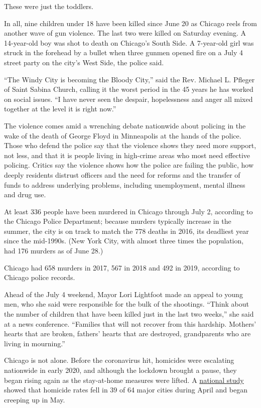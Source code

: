 These were just the toddlers.

In all, nine children under 18 have been killed since June 20 as Chicago
reels from another wave of gun violence. The last two were killed on
Saturday evening. A 14-year-old boy was shot to death on Chicago's South
Side. A 7-year-old girl was struck in the forehead by a bullet when
three gunmen opened fire on a July 4 street party on the city's West
Side, the police said.

``The Windy City is becoming the Bloody City,'' said the Rev. Michael L.
Pfleger of Saint Sabina Church, calling it the worst period in the 45
years he has worked on social issues. ``I have never seen the despair,
hopelessness and anger all mixed together at the level it is right
now.''

The violence comes amid a wrenching debate nationwide about policing in
the wake of the death of George Floyd in Minneapolis at the hands of the
police. Those who defend the police say that the violence shows they
need more support, not less, and that it is people living in high-crime
areas who most need effective policing. Critics say the violence shows
how the police are failing the public, how deeply residents distrust
officers and the need for reforms and the transfer of funds to address
underlying problems, including unemployment, mental illness and drug
use.

At least 336 people have been murdered in Chicago through July 2,
according to the Chicago Police Department; because murders typically
increase in the summer, the city is on track to match the 778 deaths in
2016, its deadliest year since the mid-1990s. (New York City, with
almost three times the population, had 176 murders as of June 28.)

Chicago had 658 murders in 2017, 567 in 2018 and 492 in 2019, according
to Chicago police records.

Ahead of the July 4 weekend, Mayor Lori Lightfoot made an appeal to
young men, who she said were responsible for the bulk of the shootings.
``Think about the number of children that have been killed just in the
last two weeks,'' she said at a news conference. ``Families that will
not recover from this hardship. Mothers' hearts that are broken,
fathers' hearts that are destroyed, grandparents who are living in
mourning.''

Chicago is not alone. Before the coronavirus hit, homicides were
escalating nationwide in early 2020, and although the lockdown brought a
pause, they began rising again as the stay-at-home measures were lifted.
A
\href{https://craftmediabucket.s3.amazonaws.com/uploads/COVID-19-Homicide_061520_Final.pdf}{national
study} showed that homicide rates fell in 39 of 64 major cities during
April and began creeping up in May.

